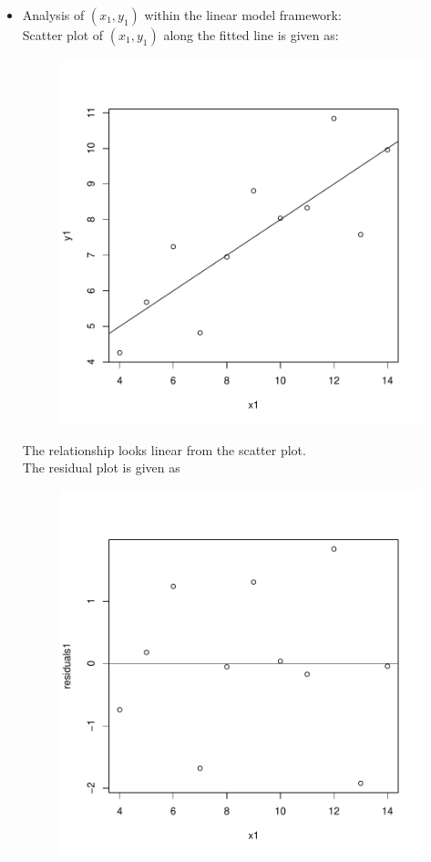 \documentclass[12pt]{article}
\begin{document}
\item
\begin{itemize}
\item Analysis of $(x_1, y_1)$ within the linear model framework:\\
Scatter plot of $(x_1, y_1)$ along the fitted line is given as:
\begin{figure}[H]
\includegraphics{HW6-002}
\end{figure}
The relationship looks linear from the scatter plot.\\
\clearpage
The residual plot is given as
\begin{figure}[H]
\includegraphics{HW6-003}

\end{figure}
\end{itemize}
\end{document}
